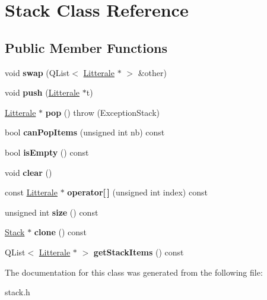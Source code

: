 \hypertarget{class_stack}{}\section{Stack Class Reference}
\label{class_stack}
\subsection*{Public Member Functions}
\begin{DoxyCompactItemize}
\item 
void {\bfseries swap} (Q\+List$<$ \hyperlink{class_litterale}{Litterale} $\ast$ $>$ \&other)\hypertarget{class_stack_a906e42093ef691a5a2225f4787e6218e}{}\label{class_stack_a906e42093ef691a5a2225f4787e6218e}

\item 
void {\bfseries push} (\hyperlink{class_litterale}{Litterale} $\ast$t)\hypertarget{class_stack_a4ff65039d5bf329702f5d30a9c9689e7}{}\label{class_stack_a4ff65039d5bf329702f5d30a9c9689e7}

\item 
\hyperlink{class_litterale}{Litterale} $\ast$ {\bfseries pop} ()  throw (\+Exception\+Stack)\hypertarget{class_stack_a37e9667dbeef8cb79d9cb4bdbaebb72b}{}\label{class_stack_a37e9667dbeef8cb79d9cb4bdbaebb72b}

\item 
bool {\bfseries can\+Pop\+Items} (unsigned int nb) const \hypertarget{class_stack_a171d983f57d41db07825233864a78447}{}\label{class_stack_a171d983f57d41db07825233864a78447}

\item 
bool {\bfseries is\+Empty} () const \hypertarget{class_stack_a5dea07bd80438c88ea0bcd5db50a8cec}{}\label{class_stack_a5dea07bd80438c88ea0bcd5db50a8cec}

\item 
void {\bfseries clear} ()\hypertarget{class_stack_adab1284b8929385d4020356fb52c8139}{}\label{class_stack_adab1284b8929385d4020356fb52c8139}

\item 
const \hyperlink{class_litterale}{Litterale} $\ast$ {\bfseries operator\mbox{[}$\,$\mbox{]}} (unsigned int index) const \hypertarget{class_stack_aef76f74d885d102151cc4e2cb236bcca}{}\label{class_stack_aef76f74d885d102151cc4e2cb236bcca}

\item 
unsigned int {\bfseries size} () const \hypertarget{class_stack_a099ad429ca3504cda12946897ab1cf15}{}\label{class_stack_a099ad429ca3504cda12946897ab1cf15}

\item 
\hyperlink{class_stack}{Stack} $\ast$ {\bfseries clone} () const \hypertarget{class_stack_aa2f1d52b0d1dc07b45bcda4894067742}{}\label{class_stack_aa2f1d52b0d1dc07b45bcda4894067742}

\item 
Q\+List$<$ \hyperlink{class_litterale}{Litterale} $\ast$ $>$ {\bfseries get\+Stack\+Items} () const \hypertarget{class_stack_ae6d2e7608f796cafbe36ee4e54895654}{}\label{class_stack_ae6d2e7608f796cafbe36ee4e54895654}

\end{DoxyCompactItemize}


The documentation for this class was generated from the following file\+:\begin{DoxyCompactItemize}
\item 
stack.\+h\end{DoxyCompactItemize}
